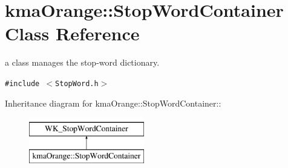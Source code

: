 \hypertarget{classkmaOrange_1_1StopWordContainer}{
\section{kmaOrange::StopWordContainer Class Reference}
\label{classkmaOrange_1_1StopWordContainer}
}
a class manages the stop-word dictionary.  


{\tt \#include $<$StopWord.h$>$}

Inheritance diagram for kmaOrange::StopWordContainer::\begin{figure}[H]
\begin{center}
\leavevmode
\includegraphics[height=2cm]{classkmaOrange_1_1StopWordContainer}
\end{center}
\end{figure}
